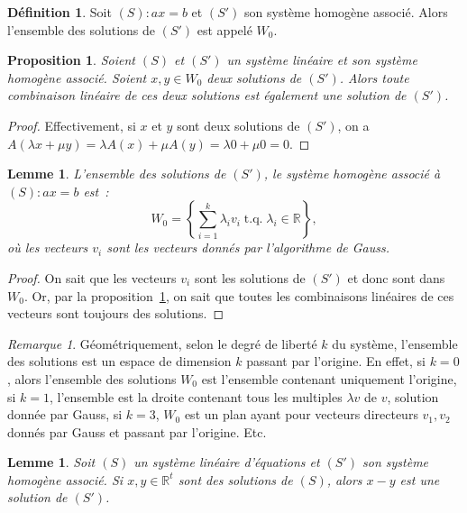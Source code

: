 \documentclass{article}
\DeclareMathOperator{\tq}{\text{ t.q. }}
\newcommand{\R}{\mathbb R}
\newtheorem{prp}[thm]{Proposition}
\newtheorem{lem}[thm]{Lemme}
\theoremstyle{definition}
\newtheorem{déf}[thm]{Définition}
\theoremstyle{remark}
\newtheorem*{rmq}{Remarque}
\begin{document}
		\begin{déf} Soit $(S) : ax = b$ et $(S')$ son système homogène associé. Alors l'ensemble des solutions de $(S')$ est appelé $W_0$. \end{déf}

		\begin{prp}\label{combiliW0} Soient $(S)$ et $(S')$ un système linéaire et son système homogène associé. Soient $x, y \in W_0$ deux solutions de $(S')$. Alors
		toute combinaison linéaire de ces deux solutions est également une solution de $(S')$. \end{prp}

		\begin{proof} Effectivement, si $x$ et $y$ sont deux solutions de $(S')$, on a $A(\lambda x + \mu y) = \lambda A(x) + \mu A(y) = \lambda 0 + \mu 0 = 0$. \end{proof}

		\begin{lem} L'ensemble des solutions de $(S')$, le système homogène associé à $(S) : ax = b$ est~:
		\[W_0 = \left\{\sum_{i=1}^k\lambda_i v_i \tq \lambda_i \in \R\right\},\]
		où les vecteurs $v_i$ sont les vecteurs donnés par l'algorithme de Gauss. \end{lem}

		\begin{proof} On sait que les vecteurs $v_i$ sont les solutions de $(S')$ et donc sont dans $W_0$. Or, par la proposition~\ref{combiliW0}, on sait que toutes les
		combinaisons linéaires de ces vecteurs sont toujours des solutions. \end{proof}

		\begin{rmq} Géométriquement, selon le degré de liberté $k$ du système, l'ensemble des solutions est un espace de dimension $k$ passant par l'origine. En effet, si
		$k=0$, alors l'ensemble des solutions $W_0$ est l'ensemble contenant uniquement l'origine, si $k=1$, l'ensemble est la droite contenant tous les multiples
		$\lambda v$ de $v$, solution donnée par Gauss, si $k=3$, $W_0$ est un plan ayant pour vecteurs directeurs $v_1, v_2$ donnés par Gauss et passant par l'origine.
		Etc. \end{rmq}

		\begin{lem}\label{W-W=W_0} Soit $(S)$ un système linéaire d'équations et $(S')$ son système homogène associé. Si $x, y \in \R^t$ sont des solutions de $(S)$,
		alors $x-y$ est une solution de $(S')$. \end{lem}
\end{document}
